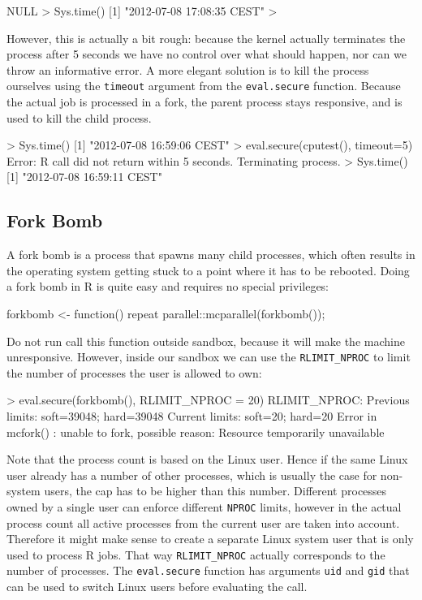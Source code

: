 \documentclass[article]{jss}
\begin{document}
\begin{appendices}
\begin{CodeChunk}
\begin{CodeInput}
NULL
> Sys.time()
[1] "2012-07-08 17:08:35 CEST"
>
\end{CodeInput}
\end{CodeChunk}
However, this is actually a bit rough: because the kernel actually terminates
the process after 5 seconds we have no control over what should happen, nor can
we throw an informative error. A more elegant solution is to kill the process
ourselves using the \texttt{timeout} argument from the \texttt{eval.secure}
function. Because the actual job is processed in a fork, the parent process
stays responsive, and is used to kill the child process.
\begin{CodeChunk}
\begin{CodeInput}
> Sys.time()
[1] "2012-07-08 16:59:06 CEST"
> eval.secure(cputest(), timeout=5)
Error: R call did not return within 5 seconds. Terminating process.
> Sys.time()
[1] "2012-07-08 16:59:11 CEST"
\end{CodeInput}
\end{CodeChunk}

\subsection{Fork Bomb}

A fork bomb is a process that spawns many child processes, which often results
in the operating system getting stuck to a point where it has to be rebooted.
Doing a fork bomb in R is quite easy and requires no special privileges:
\begin{CodeChunk}
\begin{CodeInput}
forkbomb <- function(){
  repeat{
    parallel::mcparallel(forkbomb());
  }
}
\end{CodeInput}
\end{CodeChunk}
Do not run call this function outside sandbox, because it will make the machine
unresponsive. However, inside our sandbox we can use the \texttt{RLIMIT\_NPROC}
to limit the number of processes the user is allowed to own:
\begin{CodeChunk}
\begin{CodeInput}
> eval.secure(forkbomb(), RLIMIT_NPROC = 20)
RLIMIT_NPROC:
Previous limits: soft=39048; hard=39048
Current limits: soft=20; hard=20
Error in mcfork() : 
  unable to fork, possible reason: Resource temporarily unavailable
\end{CodeInput}
\end{CodeChunk}
Note that the process count is based on the Linux user. Hence if the same Linux
user already has a number of other processes, which is usually the case for
non-system users, the cap has to be higher than this number. Different
processes owned by a single user can enforce different \texttt{NPROC} limits,
however in the actual process count all active processes from the current user
are taken into account. Therefore it might make sense to create a separate
Linux system user that is only used to process R jobs. That way \texttt{RLIMIT\_NPROC} actually
corresponds to the number of  processes. The \texttt{eval.secure}
function has arguments \texttt{uid} and \texttt{gid} that can be used to switch
Linux users before evaluating the call.



\end{appendices}
\end{document}
